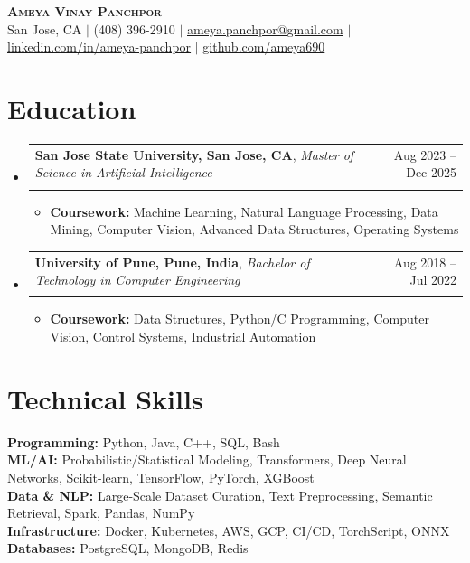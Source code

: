 \documentclass[letterpaper,10pt]{article}
\makeatletter
\newcommand{\resumeItem}[1]{
  \item[$\vcenter{\hbox{\tiny$\bullet$}}$]\small{
    #1 \vspace{-2pt}
  }
}
\newcommand{\resumeSubheading}[4]{
  \vspace{-2pt}\item
  \begin{tabular*}{0.97\textwidth}{l@{\extracolsep{\fill}}r}
    \textbf{\small #1}, \textit{\small #3} & {\small #2} \\
    & \textit{\small \textcolor{black}{#4}} \\
  \end{tabular*}\vspace{-7pt}
}
\newcommand{\resumeSubHeadingListStart}{\begin{itemize}[leftmargin=0.15in, label={}]}
\newcommand{\resumeSubHeadingListEnd}{\end{itemize}}
\newcommand{\resumeItemListStart}{\begin{itemize}}
\newcommand{\resumeItemListEnd}{\end{itemize}\vspace{-5pt}}
\makeatother
\begin{document}
\begin{center}
    \textbf{\Huge \scshape Ameya Vinay Panchpor} \\ \vspace{5pt}
    San Jose, CA $|$ (408) 396-2910 $|$
    \href{mailto:ameya.panchpor@gmail.com}{ameya.panchpor@gmail.com} $|$
    \href{https://www.linkedin.com/in/ameya-panchpor}{linkedin.com/in/ameya-panchpor} $|$
    \href{https://github.com/ameya690}{github.com/ameya690}
\end{center}

\section{\textbf{Education}}
  \resumeSubHeadingListStart
    \resumeSubheading
      {San Jose State University, San Jose, CA}{Aug 2023 – Dec 2025}
      {Master of Science in Artificial Intelligence}{}
      \resumeItemListStart
        \resumeItem{\textbf{Coursework:} Machine Learning, Natural Language Processing, Data Mining, Computer Vision, Advanced Data Structures, Operating Systems}
      \resumeItemListEnd

    \resumeSubheading
      {University of Pune, Pune, India}{Aug 2018 – Jul 2022}
      {Bachelor of Technology in Computer Engineering}{}
      \resumeItemListStart
        \resumeItem{\textbf{Coursework:} Data Structures, Python/C Programming, Computer Vision, Control Systems, Industrial Automation}
      \resumeItemListEnd
  \resumeSubHeadingListEnd

\section{\textbf{Technical Skills}}
\begin{itemize}[leftmargin=0.15in, label={}]
\small{\item{
  \textbf{Programming:} Python, Java, C++, SQL, Bash \\
  \textbf{ML/AI:} Probabilistic/Statistical Modeling, Transformers, Deep Neural Networks, Scikit-learn, TensorFlow, PyTorch, XGBoost \\
  \textbf{Data \& NLP:} Large-Scale Dataset Curation, Text Preprocessing, Semantic Retrieval, Spark, Pandas, NumPy \\
  \textbf{Infrastructure:} Docker, Kubernetes, AWS, GCP, CI/CD, TorchScript, ONNX \\
  \textbf{Databases:} PostgreSQL, MongoDB, Redis
}}
\end{itemize}
\end{document}
